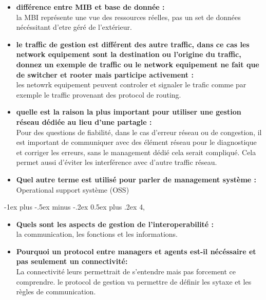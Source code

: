 \documentclass[12pt,landscape]{article}
\makeatletter
\renewcommand{\section}{\@startsection{section}{1}{0mm}%
                                {-1ex plus -.5ex minus -.2ex}%
                                {0.5ex plus .2ex}%
                                {\normalfont\large\bfseries}}
\makeatother
\begin{document}
\begin{multicols}{2}
\begin{itemize}
 \item \textbf{différence entre MIB et base de donnée :}\\
 la MBI représente une vue des ressources réelles, pas un set de données nécéssitant d'etre géré de l'extérieur.
 
 \item \textbf{le traffic de gestion est différent des autre traffic, dans ce cas les network equipement sont la destination ou l'origine du traffic, donnez un exemple de traffic ou le network equipement ne fait que de switcher et rooter mais participe activement :}\\
 les netowrk equipement peuvent controler et signaler le trafic comme par exemple le traffic provenant des protocol de routing.
 
 \item \textbf{quelle est la raison la plus important pour utiliser une gestion réseau dédiée au lieu d'une partagle :}\\
 Pour des questions de fiabilité, dans le cas d'erreur réseau ou de congestion, il est important de communiquer avec des élément réseau pour le diagnostique et corriger les erreurs, sans le management dédié cela serait compliqué. Cela permet aussi d'éviter les interférence avec d'autre traffic réseau.
 
 \item \textbf{Quel autre terme est utilisé pour parler de management système :}\\
 Operational support système (OSS)
 
\end{itemize}

\section{4, }

\begin{itemize}
 \item \textbf{Quels sont les aspects de gestion de l'interoperabilité  :}\\
 la communication, les fonctions et les informations.
 
 \item \textbf{Pourquoi un protocol entre managers et agents est-il nécéssaire et pas seulement un connectivité:}\\
 La connectivité leurs permettrait de s'entendre mais pas forcement ce comprendre. le protocol de gestion va permettre de définir les sytaxe et les règles de communication.
 

\end{itemize}
\end{multicols}
\end{document}
